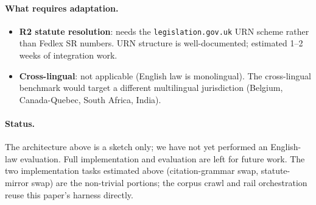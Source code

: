 \paragraph{What requires adaptation.}
\begin{itemize}
\item \textbf{R2 statute resolution}: needs the
\texttt{legislation.gov.uk} URN scheme rather than Fedlex SR numbers.
URN structure is well-documented; estimated 1--2 weeks of integration
work.
\item \textbf{Cross-lingual}: not applicable (English law is
monolingual). The cross-lingual benchmark would target a different
multilingual jurisdiction (Belgium, Canada-Quebec, South Africa,
India).
\end{itemize}

\paragraph{Status.} The architecture above is a sketch only; we have
not yet performed an English-law evaluation. Full implementation and
evaluation are left for future work. The two implementation tasks
estimated above (citation-grammar swap, statute-mirror swap) are the
non-trivial portions; the corpus crawl and rail orchestration reuse
this paper's harness directly.
